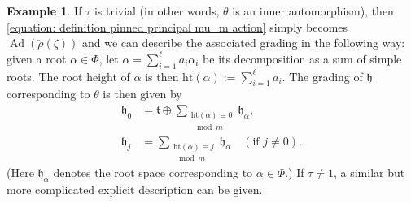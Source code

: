 \documentclass{article} %
\numberwithin{equation}{section}
\theoremstyle{definition}
\newtheorem{example}[proposition]{Example}
\DeclareMathOperator{\Ad}{Ad}
\newcommand{\height}{\mathrm{ht}}
\newcommand{\frakh}{\mathfrak h}
\newcommand{\frakt}{\mathfrak t}
\newcommand{\al}{\alpha}
\begin{document}
\begin{example}\label{ex-princ-inner}
If $\tau$ is trivial (in other words, $\theta$ is an inner automorphism), then \eqref{equation: definition pinned principal mu_m action} simply becomes $\Ad(\check{\rho}(\zeta))$ and we can describe the associated grading in the following way: given a root $\al \in \Phi$, let $\al = \sum_{i = 1}^\ell a_i\al_i$ be its decomposition as a sum of simple roots. The root height of $\al$ is then $\height(\al) := \sum_{i = 1}^\ell a_i$. The grading of $\frakh$ corresponding to $\theta$ is then given by
\begin{align*}
\frakh_0 &= \frakt \oplus \sum_{\substack{\height(\al) \equiv 0\\ \mod m}} \frakh_\al,\\
\frakh_j &= \sum_{\substack{\height(\al) \equiv j \\\mod m}} \frakh_\al \quad (\text{if }j \neq 0).
\end{align*}
(Here $\frakh_\al$ denotes the root space corresponding to $\al \in \Phi$.) If $\tau\neq 1$, a similar but more complicated explicit description can be given.
\end{example}
\end{document}
